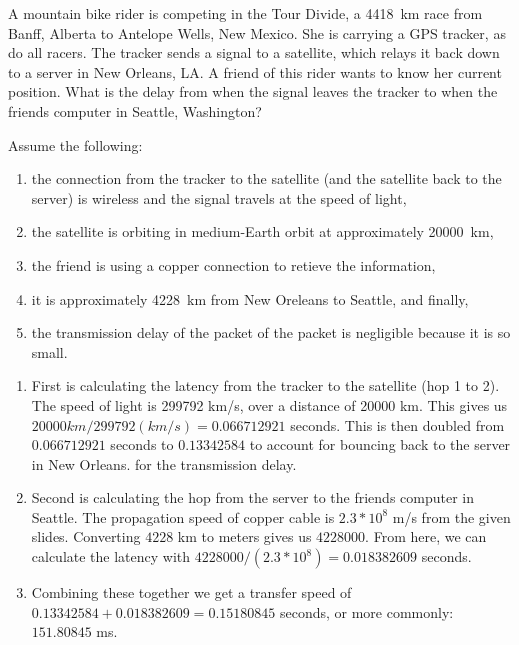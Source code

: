 \documentclass[12pt,addpoints,answers]{exam}
\begin{document}
\begin{questions}
\question[12] A mountain bike rider is competing in the Tour Divide, a \SI{4418}{\kilo\meter} race from Banff, Alberta to Antelope Wells, New Mexico. She is carrying a GPS tracker, as do all racers. The tracker sends a signal to a satellite, which relays it back down to a server in New Orleans, LA. A friend of this rider wants to know her current position. What is the delay from when the signal leaves the tracker to when the friends computer in Seattle, Washington?

Assume the following:
\begin{enumerate}
\item the connection from the tracker to the satellite (and the satellite back to the server) is wireless and the signal travels at the speed of light,
\item the satellite is orbiting in medium-Earth orbit at approximately \SI{20000}{\kilo\meter},
\item the friend is using a copper connection to retieve the information,
\item it is approximately \SI{4228}{\kilo\meter} from New Oreleans to Seattle, and finally,
\item the transmission delay of the packet of the packet is negligible because it is so small.
\end{enumerate}
\begin{solution}
	\begin{enumerate}
		\item First is calculating the latency from the tracker to the satellite (hop 1 to 2).  The speed of light is 299792 km/s, over a distance of 20000 km.  This gives us $20000 km / 299792 (km/s) = 0.066712921$ seconds.  This is then doubled from $0.066712921$ seconds to $0.13342584$ to account for bouncing back to the server in New Orleans. for the transmission delay.
		
		\item Second is calculating the hop from the server to the friends computer in Seattle.  The propagation speed of copper cable is $2.3 * 10^8$ m/s from the given slides.  Converting $4228$ km to meters gives us $4228000$.  From here, we can calculate the latency with $4228000/(2.3 * 10^8) = 0.018382609$ seconds.
		
		\item Combining these together we get a transfer speed of $0.13342584 + 0.018382609 = 0.15180845$ seconds, or more commonly:$151.80845$ ms. 
	\end{enumerate}
\end{solution}


\end{questions}
\end{document}
